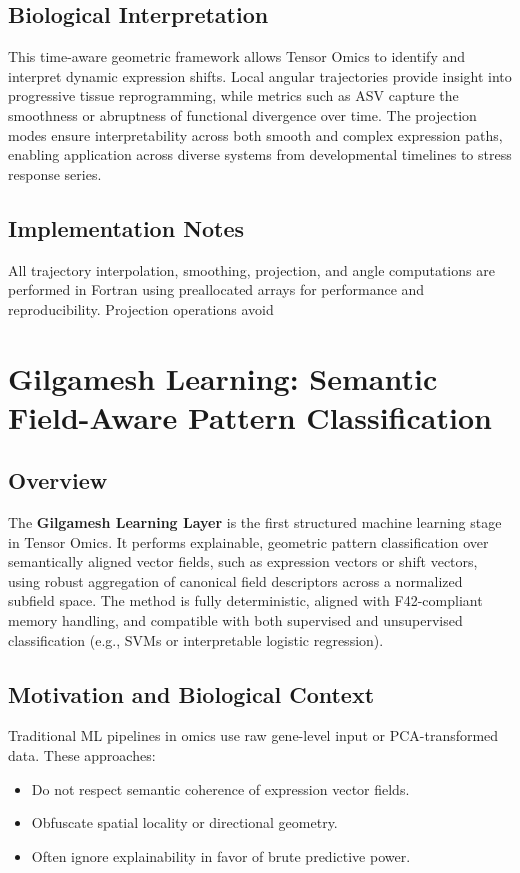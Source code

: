 \documentclass{article}
\begin{document}
\subsection{Biological Interpretation}

This time-aware geometric framework allows Tensor Omics to identify and interpret dynamic expression shifts. Local angular trajectories provide insight into progressive tissue reprogramming, while metrics such as ASV capture the smoothness or abruptness of functional divergence over time. The projection modes ensure interpretability across both smooth and complex expression paths, enabling application across diverse systems from developmental timelines to stress response series.

\subsection{Implementation Notes}

All trajectory interpolation, smoothing, projection, and angle computations are performed in Fortran using preallocated arrays for performance and reproducibility. Projection operations avoid

\section{Gilgamesh Learning: Semantic Field-Aware Pattern Classification}

\subsection{Overview}

The \textbf{Gilgamesh Learning Layer} is the first structured machine learning stage in Tensor Omics. It performs explainable, geometric pattern classification over semantically aligned vector fields, such as expression vectors or shift vectors, using robust aggregation of canonical field descriptors across a normalized subfield space. The method is fully deterministic, aligned with F42-compliant memory handling, and compatible with both supervised and unsupervised classification (e.g., SVMs or interpretable logistic regression).

\subsection{Motivation and Biological Context}

Traditional ML pipelines in omics use raw gene-level input or PCA-transformed data. These approaches:
\begin{itemize}
  \item Do not respect semantic coherence of expression vector fields.
  \item Obfuscate spatial locality or directional geometry.
  \item Often ignore explainability in favor of brute predictive power.
\end{itemize}
\end{document}
